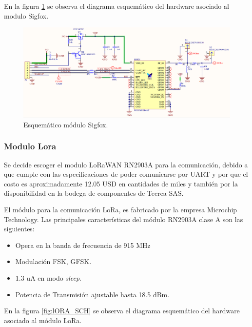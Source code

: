 En la figura \ref{fig:SIGFOX_SCH} se observa el diagrama esquemático del hardware asociado al modulo Sigfox.

\begin{figure}[h]
	\centering
	\includegraphics[scale=.4]{./Figures/SIGFOX_SCH.PNG}
	\caption{Esquemático módulo Sigfox.}
	\label{fig:SIGFOX_SCH}
\end{figure}

\subsubsection{Modulo Lora}
Se decide escoger el modulo LoRaWAN RN2903A para la comunicación, debido a que cumple con las especificaciones de poder comunicarse por UART y por que el costo es aproximadamente 12.05 USD en cantidades de miles y también por la disponibilidad en la bodega de componentes de Tecrea SAS.

El módulo para la comunicación LoRa, es fabricado por la empresa  Microchip Technology.
Las principales características del módulo RN2903A\cite{Range2018} clase A son las siguientes:
\begin{itemize}
    \item Opera en la banda de frecuencia de 915 MHz
    \item Modulación FSK, GFSK.
    \item 1.3 uA en modo \textit{sleep}.
    \item Potencia de Transmisión ajustable hasta 18.5 dBm.
\end{itemize}


En la figura \ref{fig:lORA_SCH} se observa el diagrama esquemático del hardware asociado al módulo LoRa.

